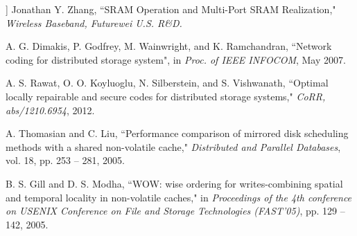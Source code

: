\documentclass[11pt,letter]{article}
\begin{document}

















\begin{thebibliography}{1}

] Jonathan Y. Zhang,  ``SRAM Operation and Multi-Port SRAM Realization," {\it Wireless Baseband, Futurewei U.S. R\&D.}

A. G. Dimakis, P. Godfrey, M. Wainwright, and K. Ramchandran, ``Network coding for distributed storage system", in {\it Proc. of IEEE INFOCOM},  May 2007.

A. S. Rawat, O. O. Koyluoglu, N. Silberstein, and S. Vishwanath, ``Optimal locally repairable and secure codes for distributed storage systems," {\it CoRR, abs/1210.6954}, 2012.

A. Thomasian and C. Liu, ``Performance comparison of mirrored disk scheduling methods with a shared non-volatile cache," {\it Distributed and Parallel Databases}, vol. 18, pp. 253 – 281, 2005.

B. S. Gill and D. S. Modha, ``WOW: wise ordering for writes-combining spatial and temporal locality in non-volatile caches,"  in {\it Proceedings of the 4th conference on USENIX Conference on File and Storage Technologies (FAST'05)}, pp. 129 – 142, 2005.

\end{thebibliography}
\end{document}
